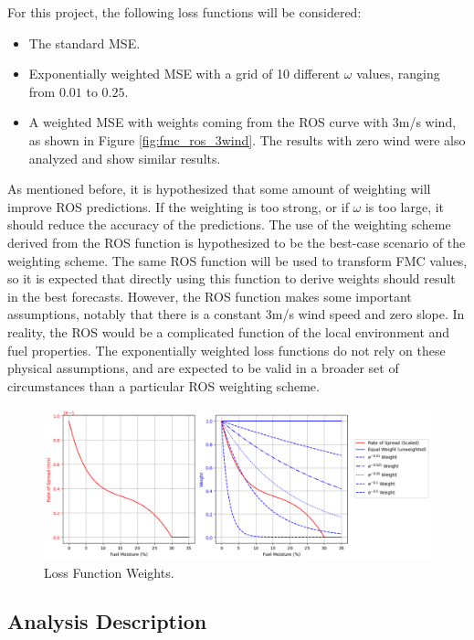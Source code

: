\documentclass[11pt]{article}%
\begin{document}
For this project, the following loss functions will be considered:

\begin{itemize}
    \item The standard MSE.
    \item Exponentially weighted MSE with a grid of 10 different $\omega$ values, ranging from $0.01$ to $0.25$.
    \item A weighted MSE with weights coming from the ROS curve with 3m/s wind, as shown in Figure \ref{fig:fmc_ros_3wind}. The results with zero wind were also analyzed and show similar results.
\end{itemize}

As mentioned before, it is hypothesized that some amount of weighting will improve ROS predictions. If the weighting is too strong, or if $\omega$ is too large, it should reduce the accuracy of the predictions. The use of the weighting scheme derived from the ROS function is hypothesized to be the best-case scenario of the weighting scheme. The same ROS function will be used to transform FMC values, so it is expected that directly using this function to derive weights should result in the best forecasts. However, the ROS function makes some important assumptions, notably that there is a constant 3m/s wind speed and zero slope. In reality, the ROS would be a complicated function of the local environment and fuel properties. The exponentially weighted loss functions do not rely on these physical assumptions, and are expected to be valid in a broader set of circumstances than a particular ROS weighting scheme.

\begin{figure}[ht]
    \centering
    \includegraphics[width=1.1\textwidth]{images/weights.png}
    \caption{Loss Function Weights.}
    \label{fig:weights}
\end{figure}

\subsection{Analysis Description}
\end{document}
